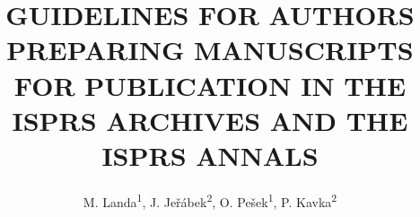\documentclass{isprs} %
\begin{document}
\title{GUIDELINES FOR AUTHORS PREPARING MANUSCRIPTS FOR PUBLICATION IN THE ISPRS ARCHIVES AND THE ISPRS ANNALS}

\author{
 M. Landa\textsuperscript{1}, J. Jeřábek\textsuperscript{2}, O. Pešek\textsuperscript{1}, P. Kavka\textsuperscript{2}}

\address{
  \textsuperscript{1 }Dept.\ of Geomatics, Faculty of Civil Engineering, Czech Technical University in Prague,\\ Czech Republic - (martin.landa, ondrej.pesek)@fsv.cvut.cz\\
  \textsuperscript{2 }Dept.\ of Landscape Water Conservation, Faculty of Civil Engineering, Czech Technical University in Prague,\\ Czech Republic - (jakub.jerabek, petr.kavka)@fsv.cvut.cz\\
}



\icwg{}   %
\end{document}

